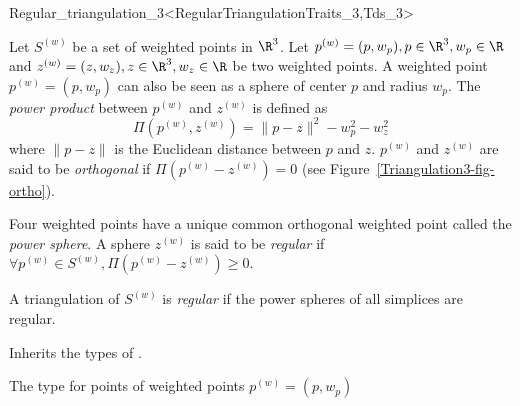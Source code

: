 

\begin{ccRefClass}{Regular_triangulation_3<RegularTriangulationTraits_3,Tds_3>}  %


\ccDefinition
  Let ${S}^{(w)}$ be a set of weighted points in $\R^3$. Let
${p}^{(w)}=(p,w_p), p\in\R^3, w_p\in\R$ and 
${z}^{(w)}=(z,w_z), z\in\R^3, w_z\in\R$ be two weighted points. 
A weighted point
${p}^{(w)}=(p,w_p)$ can also be seen as a sphere of center $p$ and
radius $w_p$. 
The \textit{power product} between ${p}^{(w)}$ and ${z}^{(w)}$ is
defined as 
\[\Pi({p}^{(w)},{z}^{(w)}) = {\|{p-z}\|^2-w_p^2-w_z^2}\]
where $\|{p-z}\|$ is the Euclidean distance between $p$ and $z$. 
 ${p}^{(w)}$ and ${z}^{(w)}$
are said to be \textit{orthogonal} if $\Pi{({p}^{(w)}-{z}^{(w)})}
= 0$ (see Figure~\ref{Triangulation3-fig-ortho}).

Four weighted points have a unique common orthogonal weighted point called
the \textit{power sphere}. A sphere ${z}^{(w)}$ is said to be
\textit{regular} if $\forall {p}^{(w)}\in{S}^{(w)},
\Pi{({p}^{(w)}-{z}^{(w)})}\geq 0$.

A triangulation of ${S}^{(w)}$ is \textit{regular} if the power spheres
of all simplices are regular. 



\ccTypes
{}

Inherits the types of .

{The type for points
 of weighted points ${p}^{(w)}=(p,w_p)$}
\ccGlue
{}


\end{ccRefClass}
